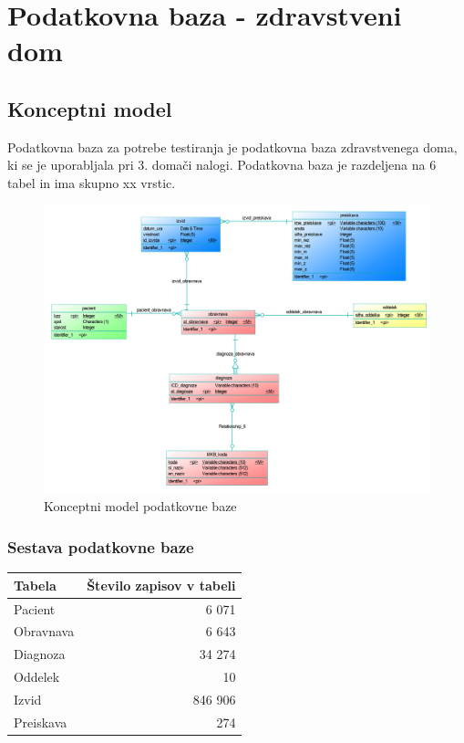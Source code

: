 \documentclass[a4paper,11pt]{report}
\begin{document}
\chapter{Podatkovna baza - zdravstveni dom}


\section{Konceptni model}
Podatkovna baza za potrebe testiranja je podatkovna baza zdravstvenega doma, ki se je uporabljala pri 3. domači nalogi.
Podatkovna baza je razdeljena na 6 tabel in ima skupno xx vrstic.

\begin{figure}[htb]
    \noindent\includegraphics[width=\linewidth]{./pics/konceptni.png}
    \caption{Konceptni model podatkovne baze}
 \end{figure}

\subsection{Sestava podatkovne baze} 

\begin{center}
    \begin{tabular}{||l|r||}
        \hline
        \textbf{Tabela} & \textbf{Število zapisov v tabeli} \\
        \hline
        Pacient & 6 071 \\
        Obravnava & 6 643\\
        Diagnoza & 34 274\\
        Oddelek & 10\\
        Izvid & 846 906 \\
        Preiskava & 274\\
        \hline
    \end{tabular}
\end{center}
\end{document}
